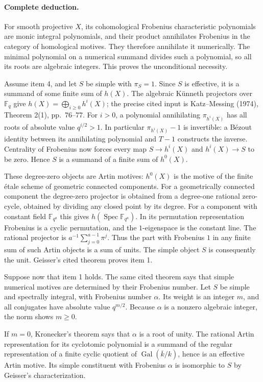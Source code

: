 \documentclass[11pt,a4paper]{article}
\theoremstyle{definition}\newtheorem{definition}[theorem]{Definition}
\theoremstyle{remark}\newtheorem{remark}[theorem]{Remark}
\begin{document}
\paragraph{Complete deduction.}
For smooth projective $X$, its cohomological Frobenius characteristic
polynomials are monic integral polynomials, and their product annihilates Frobenius
in the category of homological motives.  They therefore annihilate
it numerically.  The minimal polynomial on a numerical summand
divides such a polynomial, so all its roots are algebraic integers.
This proves the unconditional necessity.

Assume item 4, and let $S$ be simple with $\pi_S=1$.  Since $S$
is effective, it is a summand of some finite sum of $h(X)$.
The algebraic K\"unneth projectors over $\mathbb F_q$ give
$h(X)=\bigoplus_{i\geq0}h^i(X)$; the precise cited input is
Katz--Messing (1974), Theorem 2(1), pp.~76--77.
For $i>0$, a polynomial annihilating $\pi_{h^i(X)}$ has all roots
of absolute value $q^{i/2}>1$.  In particular $\pi_{h^i(X)}-1$
is invertible: a B\'ezout identity between its annihilating
polynomial and $T-1$ constructs the inverse.  Centrality of
Frobenius now forces every map $S\to h^i(X)$ and $h^i(X)\to S$
to be zero.  Hence $S$ is a summand of a finite sum of $h^0(X)$.

These degree-zero objects are Artin motives: $h^0(X)$ is the
motive of the finite \'etale scheme of geometric connected
components.  For a geometrically connected component the
degree-zero projector is obtained from a degree-one rational
zero-cycle, obtained by dividing any closed point by its degree.
For a component with constant field $\mathbb F_{q^a}$ this gives
$h(\operatorname{Spec}\mathbb F_{q^a})$.  In its permutation
representation Frobenius is a cyclic permutation, and the
$1$-eigenspace is the constant line.  The rational projector is
$a^{-1}\sum_{j=0}^{a-1}\pi^j$.  Thus the part with Frobenius $1$
in any finite sum of such Artin objects is a sum of units.  The
simple object $S$ is consequently the unit.  Geisser's cited
theorem proves item 1.

Suppose now that item 1 holds.  The same cited theorem says that
simple numerical motives are determined by their Frobenius number.
Let $S$ be simple and spectrally integral, with Frobenius number
$\alpha$.  Its weight is an integer $m$, and all conjugates have
absolute value $q^{m/2}$.  Because $\alpha$ is a nonzero algebraic
integer, the norm shows $m\geq0$.

If $m=0$, Kronecker's theorem says that $\alpha$ is a root of
unity.  The rational Artin representation for its cyclotomic
polynomial is a summand of the regular representation of a finite
cyclic quotient of $\operatorname{Gal}(\overline k/k)$, hence is
an effective Artin motive.  Its simple constituent with Frobenius
$\alpha$ is isomorphic to $S$ by Geisser's characterization.
\end{document}
